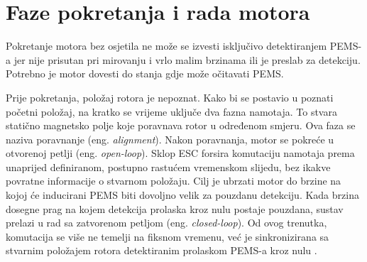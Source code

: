\documentclass[diplomskirad]{fer}
\begin{document}
\newpage

\section{Faze pokretanja i rada motora}

Pokretanje motora bez osjetila ne može se izvesti isključivo detektiranjem
PEMS-a jer nije prisutan pri mirovanju i vrlo malim brzinama ili je preslab za
detekciju. Potrebno je motor dovesti do stanja gdje može očitavati PEMS.

Prije pokretanja, položaj rotora je nepoznat. Kako bi se postavio u poznati
početni položaj, na kratko se vrijeme uključe dva fazna namotaja. To stvara
statično magnetsko polje koje poravnava rotor u određenom smjeru. Ova faza se
naziva poravnanje (eng. \textit{alignment}). Nakon poravnanja, motor se pokreće
u otvorenoj petlji (eng. \textit{open-loop}). Sklop ESC forsira komutaciju
namotaja prema unaprijed definiranom, postupno rastućem vremenskom slijedu, bez
ikakve povratne informacije o stvarnom položaju. Cilj je ubrzati motor do
brzine na kojoj će inducirani PEMS biti dovoljno velik za pouzdanu detekciju.
Kada brzina dosegne prag na kojem detekcija prolaska kroz nulu postaje
pouzdana, sustav prelazi u rad sa zatvorenom petljom (eng.
\textit{closed-loop}). Od ovog trenutka, komutacija se više ne temelji na
fiksnom vremenu, već je sinkronizirana sa stvarnim položajem rotora
detektiranim prolaskom PEMS-a kroz nulu \cite{Recasens2021}.
\end{document}
